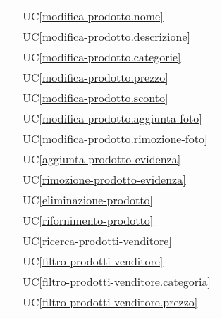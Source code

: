 \begin{longtable}{C{6cm} C{6cm}}
     & UC\ref{modifica-prodotto.nome} \\
        
     & UC\ref{modifica-prodotto.descrizione} \\
        
     & UC\ref{modifica-prodotto.categorie} \\
        
     & UC\ref{modifica-prodotto.prezzo} \\
        
     & UC\ref{modifica-prodotto.sconto} \\
        
     & UC\ref{modifica-prodotto.aggiunta-foto} \\
        
     & UC\ref{modifica-prodotto.rimozione-foto} \\
        
     & UC\ref{aggiunta-prodotto-evidenza} \\

     & UC\ref{rimozione-prodotto-evidenza} \\
        
     & UC\ref{eliminazione-prodotto} \\

     & UC\ref{rifornimento-prodotto} \\

     & UC\ref{ricerca-prodotti-venditore} \\

     & UC\ref{filtro-prodotti-venditore} \\

     & UC\ref{filtro-prodotti-venditore.categoria} \\

     & UC\ref{filtro-prodotti-venditore.prezzo} \\


\end{longtable}
